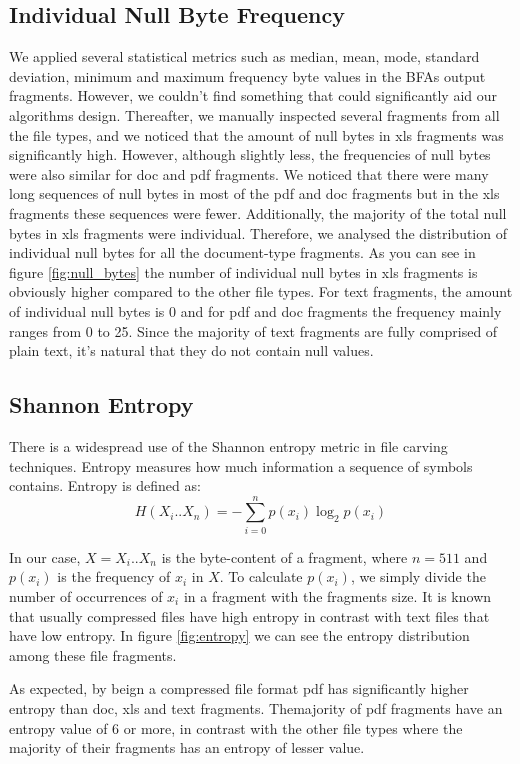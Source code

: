 \subsection{Individual Null Byte Frequency}
We applied several statistical metrics such as median, mean, mode, standard deviation, minimum and maximum frequency byte values in the BFAs output fragments. However, we couldn't find something that could significantly aid our algorithms design. Thereafter, we manually inspected several fragments from all the file types, and we noticed that the amount of null bytes in xls fragments was significantly high. However, although slightly less, the frequencies of null bytes were also similar for doc and pdf fragments. We noticed that there were many long sequences of null bytes in most of the pdf and doc fragments but in the xls fragments these sequences were fewer. Additionally, the majority of the total null bytes in xls fragments were individual. Therefore, we analysed the distribution of individual null bytes for all the document-type fragments. As you can see in figure \ref{fig:null_bytes} the number of individual null bytes in xls fragments is obviously higher compared to the other file types. For text fragments, the amount of individual null bytes is 0 and for pdf and doc fragments the frequency mainly ranges from 0 to 25. Since the majority of text fragments are fully comprised of plain text, it's natural that they do not contain null values.





\subsection{Shannon Entropy}
There is a widespread use of the Shannon entropy\cite{Shannon} metric in file carving techniques. Entropy measures how much information a sequence of symbols contains. Entropy is defined as:
 \begin{displaymath}
 H({X_i}..{X_n})=-\sum_{i=0}^{n}{p({x_i})}\log_2{p({x_i})}
\end{displaymath} 

In our case, $X={X_i}..{X_n}$  is the byte-content of a fragment, where $n=511$  and $p({x_i})$ is the frequency of ${x_i}$ in ${X}$. To calculate $p({x_i})$, we simply divide the number of occurrences of ${x_i}$ in a fragment with the fragments size. It is known that usually compressed files have high entropy in contrast with text files that have low entropy\cite{Calhoun}\cite{Jeroen}. In figure \ref{fig:entropy} we can see the entropy distribution among these file fragments.

As expected, by beign a compressed file format pdf has significantly higher entropy than doc, xls and text fragments. Themajority of pdf fragments have an entropy value of 6 or more, in contrast with the other file types  where the majority of their fragments has an entropy of lesser value.

